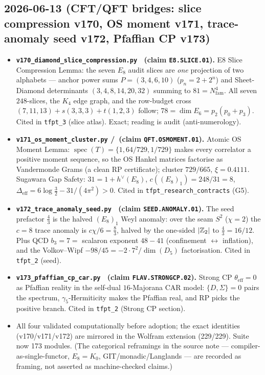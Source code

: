 \subsection*{2026-06-13 (CFT/QFT bridges: slice compression v170, OS moment v171, trace-anomaly seed v172, Pfaffian CP v173)}
\begin{itemize}
\item \textbf{\texttt{v170\_diamond\_slice\_compression.py} \mE\ (claim \texttt{E8.SLICE.01}).}
  E8 Slice Compression Lemma: the seven $E_8$ audit slices are \emph{one} projection of two
  alphabets --- anchor power sums $P=(3,4,6,10)$ ($p_n=2+2^n$) and Sheet-Diamond determinants
  $(3,4,8,14,20,32)$ summing to $81=N_{\mathrm{fam}}^4$. All seven $248$-slices, the $K_4$ edge
  graph, and the row-budget cross $(7,11,13)+s(3,3,3)+t(1,2,3)$ follow; $78=\dim E_6=p_2(p_0+p_3)$.
  Cited in \texttt{tfpt\_3} (slice atlas). Exact; reading is audit (anti-numerology).
\item \textbf{\texttt{v171\_os\_moment\_cluster.py} \mE/\mC\ (claim \texttt{QFT.OSMOMENT.01}).}
  Atomic OS Moment Lemma: $\operatorname{spec}(T)=\{1,64/729,1/729\}$ makes every correlator a
  positive moment sequence, so the OS Hankel matrices factorise as Vandermonde Grams (a clean RP
  certificate); cluster $729/665$, $\xi=0.4111$. Sugawara Gap Safety: $31=1+h^\vee(E_8)$,
  $c((E_8)_1)=248/31=8$, $\Delta_{\mathrm{eff}}=6\log\tfrac32-31/(4\pi^2)>0$. Cited in
  \texttt{tfpt\_research\_contracts} (G5).
\item \textbf{\texttt{v172\_trace\_anomaly\_seed.py} \mE\ (claim \texttt{SEED.ANOMALY.01}).}
  The seed prefactor $\tfrac43$ is the halved $(E_8)_1$ Weyl anomaly: over the seam $S^2$ ($\chi=2$)
  the $c=8$ trace anomaly is $c\chi/6=\tfrac83$, halved by the one-sided $|\mathbb{Z}_2|$ to
  $\tfrac43=16/12$. Plus QCD $b_3=7=$ scalaron exponent $48-41$ (confinement $\leftrightarrow$
  inflation), and the Volkov--Wipf $-98/45=-2\cdot7^2/\dim(D_5)$ factorisation. Cited in
  \texttt{tfpt\_2} (seed).
\item \textbf{\texttt{v173\_pfaffian\_cp\_car.py} \mE\ (claim \texttt{FLAV.STRONGCP.02}).}
  Strong CP $\theta_{\mathrm{eff}}=0$ as Pfaffian reality in the self-dual $16$-Majorana CAR model:
  $\{D,\Sigma\}=0$ pairs the spectrum, $\gamma_5$-Hermiticity makes the Pfaffian real, and RP picks
  the positive branch. Cited in \texttt{tfpt\_2} (Strong CP section).
\item All four validated computationally before adoption; the exact identities (v170/v171/v172) are
  mirrored in the Wolfram extension (229/229). Suite now 173 modules. (The categorical reframings
  in the source note --- compiler-as-single-functor, $E_8=K_0$, GIT/monadic/Langlands --- are
  recorded as framing, not asserted as machine-checked claims.)
\end{itemize}

